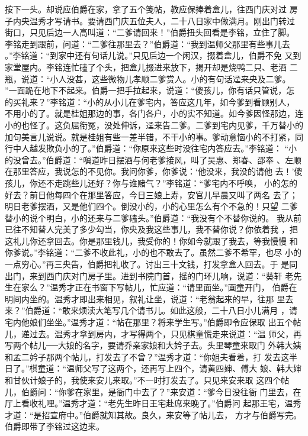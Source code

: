 按下一头。却说应伯爵在家，拿了五个笺帖，教应保捧着盒儿，往西门庆对过
房子内央温秀才写请书。要请西门庆五位夫人，二十八日家中做满月。刚出门转过
街口，只见后边一人高叫道：“二爹请回来！”伯爵扭头回看是李铭，立住了脚。
李铭走到跟前，问道：“二爹往那里去？”伯爵道：“我到温师父那里有些事儿去
。”李铭道：“到家中还有句话儿说。”只见后边一个闲汉，掇着盒儿，伯爵不免
又到家堂屋内。李铭连忙磕了个头，把盒儿掇进来放下，揭开却是烧鸭二只、老酒
二瓶，说道：“小人没甚，这些微物儿孝顺二爹赏人。小的有句话迳来央及二爹。
”一面跪在地下不起来。伯爵一把手拉起来，说道：“傻孩儿，你有话只管说，怎
的买礼来？”李铭道：“小的从小儿在爹宅内，答应这几年，如今爹到看顾别人，
不用小的了。就是桂姐那边的事，各门各户，小的实不知道。如今爹因怪那边，连
小的也怪了。这负屈衔冤，没处伸诉，迳来告二爹。二爹到宅内见爹，千万替小的
加句美言儿说说。就是桂姐有些一差半错，不干小的事。爹动意恼小的不打紧，同
行中人越发欺负小的了。”伯爵道：“你原来这些时没往宅内答应去。”李铭道：
“小的没曾去。”伯爵道：“嗔道昨日摆酒与何老爹接风，叫了吴惠、郑春、邵奉
、左顺在那里答应，我说怎的不见你。我问你爹，你爹说：‘他没来，我没的请他
去！’傻孩儿，你还不走跳些儿还好？你与谁赌气？”李铭道：“爹宅内不呼唤，
小的怎的好去？前日他每四个在那里答应，今日三娘上寿，安官儿早晨又叫了两名
去了；明日老爹摆酒，又是他们四个。倒没小的，小的心里怎么有个不急的！只望
二爹替小的说个明白，小的还来与二爹磕头。”伯爵道：“我没有个不替你说的。
我从前已往不知替人完美了多少勾当，你央及我这些事儿，我不替你说？你依着我
，把这礼儿你还拿回去。你是那里钱儿，我受你的！你如今就跟了我去，等我慢慢
和你爹说。”李铭道：“二爹不收此礼，小的也不敢去了。虽然二爹不希罕，也尽
小的一点穷心。”再三央告，伯爵把礼收了。讨出三十文钱，打发拿盒人回去。于
是同出门，来到西门庆对门房子里。进到书院门首，摇的门环儿响，说道：“葵轩
老先生在家么？”温秀才正在书窗下写帖儿，忙应道：“请里面坐。”画童开门，
伯爵在明间内坐的。温秀才即出来相见，叙礼让坐，说道：“老翁起来的早，往那
里去来？”伯爵道：“敢来烦渎大笔写几个请书儿。如此这般，二十八日小儿满月
，请宅内他娘们坐坐。”温秀才道：“帖在那里？将来学生写。”伯爵即令应保取
出五个帖儿，递过去。温秀才拿到房内，才写得两个，只见棋童慌走来说道：“温
师父，再写两个帖儿──大娘的名字，要请乔亲家娘和大妗子去。头里琴童来取门
外韩大姨和孟二妗子那两个帖儿，打发去了不曾？”温秀才道：“你姐夫看着，打
发去这半日了。”棋童道：“温师父写了这两个，还再写上四个，请黄四婶、傅大
娘、韩大婶和甘伙计娘子的，我使来安儿来取。”不一时打发去了。只见来安来取
这四个帖儿，伯爵问：“你爹在家里，是衙门中去了？”来安道：“爹今日没往衙
门里去，在厅上看收礼哩。”温秀才道：“老先生昨日王宅赴席来晚了。”伯爵问
起那王宅，温秀才道：“是招宣府中。”伯爵就知其故。良久，来安等了帖儿去，
方才与伯爵写完。伯爵即带了李铭过这边来。

